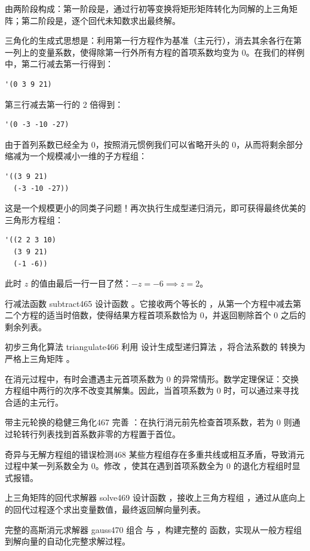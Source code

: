 由两阶段构成：第一阶段是，通过行初等变换将矩形矩阵转化为同解的上三角矩阵；第二阶段是，逐个回代未知数求出最终解。

三角化的生成式思想是：利用第一行方程作为基准（主元行），消去其余各行在第一列上的变量系数，使得除第一行外所有方程的首项系数均变为 0。在我们的样例中，第二行减去第一行得到：
\begin{lstlisting}[language=BSL]
'(0 3 9 21)
\end{lstlisting}
第三行减去第一行的 2 倍得到：
\begin{lstlisting}[language=BSL]
'(0 -3 -10 -27)
\end{lstlisting}
由于首列系数已经全为 0，按照消元惯例我们可以省略开头的 0，从而将剩余部分缩减为一个规模减小一维的子方程组：
\begin{lstlisting}[language=BSL]
'((3 9 21)
  (-3 -10 -27))
\end{lstlisting}
这是一个规模更小的同类子问题！再次执行生成型递归消元，即可获得最终优美的三角形方程组：
\begin{lstlisting}[language=BSL]
'((2 2 3 10)
  (3 9 21)
  (-1 -6))
\end{lstlisting}
此时 $z$ 的值由最后一行一目了然：$-z = -6 \implies z = 2$。

\begin{exercise}{行减法函数 subtract}{465}\label{ex:465}
设计函数 。它接收两个等长的 ，从第一个方程中减去第二个方程的适当时倍数，使得结果方程首项系数恰为 0，并返回剔除首个 0 之后的剩余列表。
\end{exercise}

\begin{exercise}{初步三角化算法 triangulate}{466}\label{ex:466}
利用  设计生成型递归算法 ，将合法系数的  转换为严格上三角矩阵 。
\end{exercise}

在消元过程中，有时会遭遇主元首项系数为 0 的异常情形。数学定理保证：交换方程组中两行的次序不改变其解集。因此，当首项系数为 0 时，可以通过来寻找合适的主元行。

\begin{exercise}{带主元轮换的稳健三角化}{467}\label{ex:467}
完善 ：在执行消元前先检查首项系数，若为 0 则通过轮转行列表找到首系数非零的方程置于首位。
\end{exercise}

\begin{exercise}{奇异与无解方程组的错误检测}{468}\label{ex:468}
某些方程组存在多重共线或相互矛盾，导致消元过程中某一列系数全为 0。修改 ，使其在遇到首项系数全为 0 的退化方程组时显式报错。
\end{exercise}

\begin{exercise}{上三角矩阵的回代求解器 solve}{469}\label{ex:469}
设计函数 ，接收上三角方程组 ，通过从底向上的回代过程逐个求出变量数值，最终返回解向量列表。
\end{exercise}

\begin{exercise}{完整的高斯消元求解器 gauss}{470}\label{ex:470}
组合  与 ，构建完整的  函数，实现从一般方程组到解向量的自动化完整求解过程。
\end{exercise}
